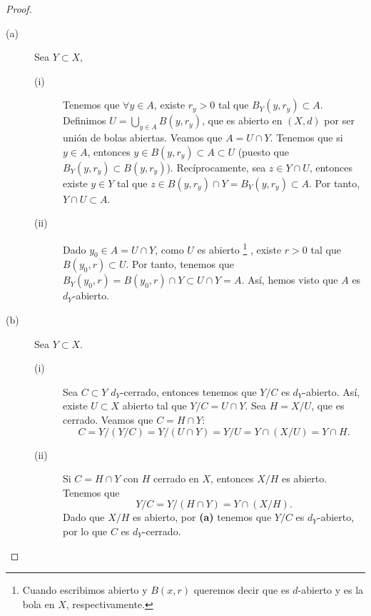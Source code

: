 \begin{proof}
\begin{description}
\item[(a)] Sea $\displaystyle Y \subset X $,
	\begin{description}
	\item[(i)] Tenemos que $\displaystyle \forall y \in A $, existe $\displaystyle r_{y}>0 $ tal que $\displaystyle B_{Y}\left(y,r_{y}\right) \subset A $. Definimos $\displaystyle U = \bigcup_{y \in A}B\left(y,r_{y}\right) $, que es abierto en $\displaystyle \left(X,d\right) $ por ser unión de bolas abiertas.
Veamos que $\displaystyle A = U \cap Y $. Tenemos que si $\displaystyle y \in A $, entonces $\displaystyle y \in B\left(y, r_{y}\right) \subset A \subset U $ (puesto que $\displaystyle B_{Y}\left(y, r_{y}\right) \subset B\left(y, r_{y}\right) $).
Recíprocamente, sea $\displaystyle z \in Y \cap U $, entonces existe $\displaystyle y \in Y $ tal que $\displaystyle z \in B\left(y,r_{y}\right) \cap Y = B_{Y}\left(y,r_{y}\right) \subset A$. Por tanto, $\displaystyle Y \cap U \subset A $.
	\item[(ii)] Dado $\displaystyle y_{0} \in A = U \cap Y $, como $\displaystyle U $ es abierto \footnote{Cuando escribimos abierto y $\displaystyle B\left(x,r\right) $ queremos decir que es $\displaystyle d $-abierto y es la bola en $\displaystyle X $, respectivamente.} , existe $\displaystyle r > 0 $ tal que $\displaystyle B\left(y_{0}, r\right)\subset U $. Por tanto, tenemos que $\displaystyle B_{Y}\left(y_{0}, r\right) = B\left(y_{0}, r\right)\cap Y \subset U \cap Y = A $. Así, hemos visto que $\displaystyle A $ es $\displaystyle d _{Y} $-abierto.
	\end{description}
\item[(b)] Sea $\displaystyle Y \subset X $.
	\begin{description}
	\item[(i)] Sea $\displaystyle C \subset Y $ $\displaystyle d _{Y} $-cerrado, entonces tenemos que $\displaystyle Y/C $ es $\displaystyle d _{Y} $-abierto. Así, existe $\displaystyle U \subset X $ abierto tal que $\displaystyle Y/C = U \cap Y $. Sea $\displaystyle H = X/U $, que es cerrado. Veamos que $\displaystyle C = H \cap Y $:
\[C = Y / \left(Y / C\right) = Y / \left(U \cap Y\right) = Y / U = Y \cap \left(X/U\right) = Y \cap H .\]
\item[(ii)] Si $\displaystyle C = H\cap Y $ con $\displaystyle H $ cerrado en $\displaystyle X $, entonces $\displaystyle X/H $ es abierto. Tenemos que
	\[Y/C = Y / \left(H \cap Y\right) = Y \cap \left(X/H\right) .\]
	Dado que $\displaystyle X/H $ es abierto, por \textbf{(a)} tenemos que $\displaystyle Y/C $ es $\displaystyle d _{Y} $-abierto, por lo que $\displaystyle C $ es $\displaystyle d _{Y} $-cerrado.
	\end{description}
\end{description}
\end{proof}


